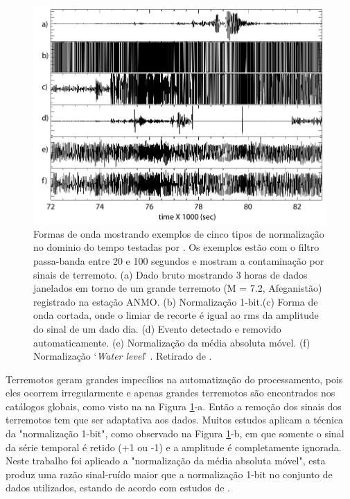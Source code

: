 \begin{figure}[!ht]
\centering
\includegraphics[scale=0.55]{Figs/temporal_norma.png}
\caption[Formas de onda mostrando exemplos de cinco tipos de normalização no dominio do tempo.]{Formas de onda mostrando exemplos de cinco tipos de normalização no dominio do tempo testadas por \cite{bensen_processing_2007}. Os exemplos estão com o filtro passa-banda entre 20 e 100 segundos e mostram a contaminação por sinais de terremoto. (a)  Dado bruto mostrando 3 horas de dados janelados em torno de um grande terremoto (M = 7.2, Afeganistão) registrado na estação ANMO. (b) Normalização 1-bit.(c) Forma de onda cortada, onde o limiar de recorte é igual ao rms da amplitude do sinal de um dado dia. (d) Evento detectado e removido automaticamente. (e) Normalização da média absoluta móvel. (f) Normalização ‘\textit{Water level}’ . Retirado de \cite{bensen_processing_2007}.}
\label{temporal_norma}
\end{figure} 

Terremotos geram grandes impecílios na automatização do processamento, pois eles ocorrem irregularmente e apenas grandes terremotos são encontrados nos catálogos globais, como visto na na Figura \ref{temporal_norma}-a. Então a remoção dos sinais dos terremotos tem que ser adaptativa aos dados. Muitos estudos aplicam a técnica da "normalização 1-bit", como observado na Figura \ref{temporal_norma}-b, em que somente o sinal da série temporal é retido (+1 ou -1) e a amplitude é completamente ignorada. Neste trabalho foi aplicado a "normalização da média absoluta móvel", esta produz uma razão sinal-ruído maior que a normalização 1-bit no conjunto de dados utilizados, estando de acordo com estudos de \cite{seats_improved_2012}.

